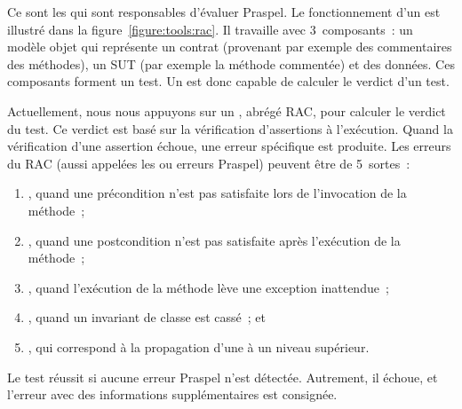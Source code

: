 Ce sont les  qui sont responsables d'évaluer
Praspel. Le fonctionnement d'un  est illustré dans
la figure~\ref{figure:tools:rac}. Il travaille avec 3~composants~: un modèle
objet qui représente un contrat (provenant par exemple des commentaires des
méthodes), un SUT (par exemple la méthode commentée) et des données. Ces
composants forment un test. Un  est donc capable de
calculer le verdict d'un test.

Actuellement, nous nous appuyons sur un ,
abrégé RAC, pour calculer le verdict du test. Ce verdict est basé sur la
vérification d'assertions à l'exécution. Quand la vérification d'une assertion
échoue, une erreur spécifique est produite. Les erreurs du RAC (aussi appelées
les  ou erreurs Praspel) peuvent être de 5~sortes~:
%
\begin{enumerate}

\item {}, quand une précondition n'est pas
satisfaite lors de l'invocation de la méthode~;

\item {}, quand une postcondition n'est pas
satisfaite après l'exécution de la méthode~;

\item {}, quand l'exécution de la méthode lève une
exception inattendue~;

\item {}, quand un invariant de classe est cassé~; et

\item {}, qui correspond à la propagation
d'une  à un niveau supérieur.

\end{enumerate}
%
Le test réussit si aucune erreur Praspel n'est détectée. Autrement, il échoue,
et l'erreur avec des informations supplémentaires est consignée.

